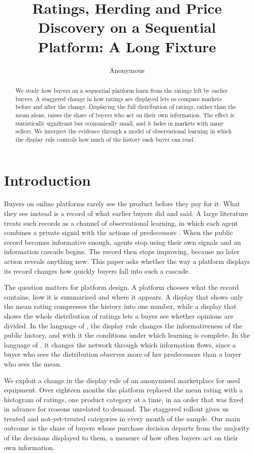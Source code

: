 \documentclass[12pt]{article}
\title{Ratings, Herding and Price Discovery on a Sequential Platform: A Long Fixture}
\author{Anonymous}
\date{}
\begin{document}
\maketitle
\begin{abstract}
We study how buyers on a sequential platform learn from the ratings left by earlier buyers. A staggered change in how ratings are displayed lets us compare markets before and after the change. Displaying the full distribution of ratings, rather than the mean alone, raises the share of buyers who act on their own information. The effect is statistically significant but economically small, and it fades in markets with many sellers. We interpret the evidence through a model of observational learning in which the display rule controls how much of the history each buyer can read.
\end{abstract}

\section{Introduction}
Buyers on online platforms rarely see the product before they pay for it. What they see instead is a record of what earlier buyers did and said. A large literature treats such records as a channel of observational learning, in which each agent combines a private signal with the actions of predecessors \citep{banerjee1992, bikhchandani1992}. When the public record becomes informative enough, agents stop using their own signals and an information cascade begins. The record then stops improving, because no later action reveals anything new. This paper asks whether the way a platform displays its record changes how quickly buyers fall into such a cascade.

The question matters for platform design. A platform chooses what the record contains, how it is summarised and where it appears. A display that shows only the mean rating compresses the history into one number, while a display that shows the whole distribution of ratings lets a buyer see whether opinions are divided. In the language of \citet{smith2000}, the display rule changes the informativeness of the public history, and with it the conditions under which learning is complete. In the language of \citet{acemoglu2011}, it changes the network through which information flows, since a buyer who sees the distribution observes more of her predecessors than a buyer who sees the mean.

We exploit a change in the display rule of an anonymised marketplace for used equipment. Over eighteen months the platform replaced the mean rating with a histogram of ratings, one product category at a time, in an order that was fixed in advance for reasons unrelated to demand. The staggered rollout gives us treated and not-yet-treated categories in every month of the sample. Our main outcome is the share of buyers whose purchase decision departs from the majority of the decisions displayed to them, a measure of how often buyers act on their own information.
\end{document}

